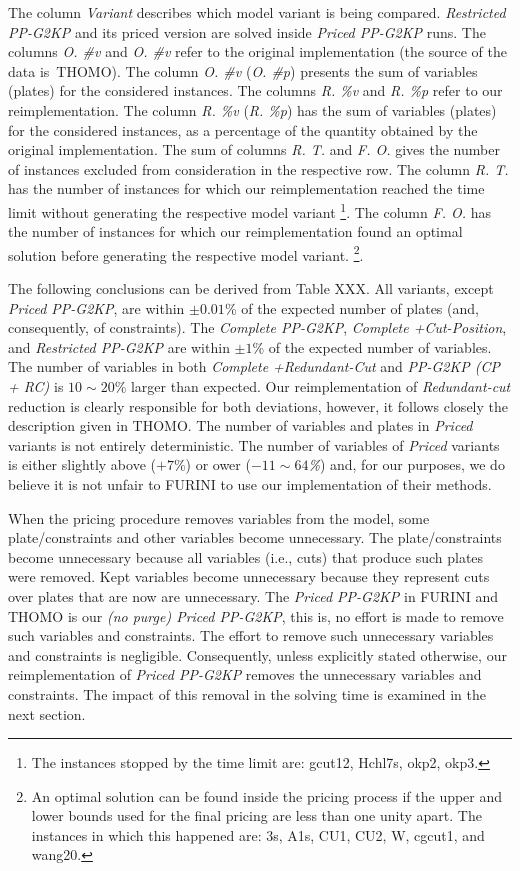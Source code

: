 \documentclass[smallextended]{svjour3}       %
\begin{document}
The column \emph{Variant} describes which model variant is being compared.
\emph{Restricted PP-G2KP} and its priced version are solved inside \emph{Priced PP-G2KP} runs.
The columns \emph{O. \#v} and \emph{O. \#v} refer to the original implementation (the source of the data is~THOMO).
The column \emph{O. \#v} (\emph{O. \#p}) presents the sum of variables (plates) for the considered instances.
The columns \emph{R. \%v} and \emph{R. \%p} refer to our reimplementation.
The column \emph{R. \%v} (\emph{R. \%p}) has the sum of variables (plates) for the considered instances, as a percentage of the quantity obtained by the original implementation.
The sum of columns \emph{R. T.} and \emph{F. O.} gives the number of instances excluded from consideration in the respective row.
The column \emph{R. T.} has the number of instances for which our reimplementation reached the time limit without generating the respective model variant
\footnote{
	The instances stopped by the time limit are: gcut12, Hchl7s, okp2, okp3.
}.
The column \emph{F. O.} has the number of instances for which our reimplementation found an optimal solution before generating the respective model variant.
\footnote{
	An optimal solution can be found inside the pricing process if the upper and lower bounds used for the final pricing are less than one unity apart.
	The instances in which this happened are: 3s, A1s, CU1, CU2, W, cgcut1, and wang20.
}.

The following conclusions can be derived from Table XXX.
All variants, except \emph{Priced PP-G2KP}, are within \(\pm0.01\)\% of the expected number of plates (and, consequently, of constraints).
The \emph{Complete PP-G2KP}, \emph{Complete +Cut-Position}, and \emph{Restricted PP-G2KP} are within \(\pm1\)\% of the expected number of variables.
The number of variables in both \emph{Complete +Redundant-Cut} and \emph{PP-G2KP (CP + RC)} is \(10\sim20\)\% larger than expected.
Our reimplementation of \emph{Redundant-cut} reduction is clearly responsible for both deviations, however, it follows closely the description given in THOMO.
The number of variables and plates in \emph{Priced} variants is not entirely deterministic.
The number of variables of \emph{Priced} variants is either slightly above (\(+7\)\%) or ower (\emph{\(-11\sim64\)\%}) and, for our purposes, we do believe it is not unfair to FURINI to use our implementation of their methods.

When the pricing procedure removes variables from the model, some plate/constraints and other variables become unnecessary.
The plate/constraints become unnecessary because all variables (i.e., cuts) that produce such plates were removed.
Kept variables become unnecessary because they represent cuts over plates that are now are unnecessary.
The \emph{Priced PP-G2KP} in FURINI and THOMO is our \emph{(no purge) Priced PP-G2KP}, this is, no effort is made to remove such variables and constraints.
The effort to remove such unnecessary variables and constraints is negligible.
Consequently, unless explicitly stated otherwise, our reimplementation of \emph{Priced PP-G2KP} removes the unnecessary variables and constraints.
The impact of this removal in the solving time is examined in the next section.
\end{document}
